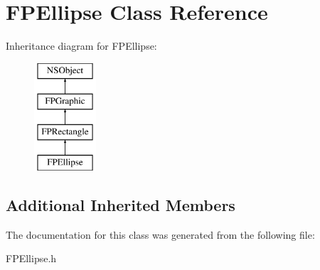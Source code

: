 \hypertarget{interface_f_p_ellipse}{}\section{F\+P\+Ellipse Class Reference}
\label{interface_f_p_ellipse}
Inheritance diagram for F\+P\+Ellipse\+:\begin{figure}[H]
\begin{center}
\leavevmode
\includegraphics[height=4.000000cm]{interface_f_p_ellipse}
\end{center}
\end{figure}
\subsection*{Additional Inherited Members}


The documentation for this class was generated from the following file\+:\begin{DoxyCompactItemize}
\item 
F\+P\+Ellipse.\+h\end{DoxyCompactItemize}
